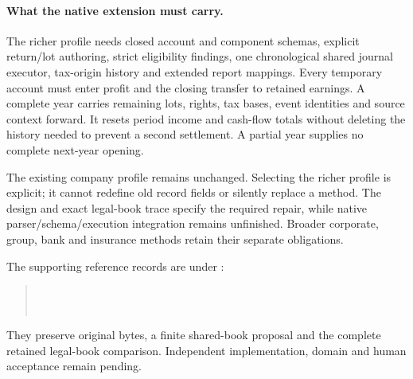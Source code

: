 \paragraph{What the native extension must carry.}
The richer profile needs closed account and component schemas, explicit
return/lot authoring, strict eligibility findings, one chronological shared
journal executor, tax-origin history and extended report mappings. Every
temporary account must enter profit and the closing transfer to retained
earnings. A complete year carries remaining lots, rights, tax bases, event
identities and source context forward. It resets period income and cash-flow
totals without deleting the history needed to prevent a second settlement.
A partial year supplies no complete next-year opening.

The existing company profile remains unchanged. Selecting the richer profile
is explicit; it cannot redefine old record fields or silently replace a
method. The design and exact legal-book trace specify the required repair,
while native parser/schema/execution integration remains unfinished. Broader
corporate, group, bank and insurance methods retain their separate obligations.

The supporting reference records are under :
\begin{quote}\small
{}\\
\\
\end{quote}
They preserve original bytes, a finite shared-book proposal and the complete
retained legal-book comparison. Independent implementation, domain and human
acceptance remain pending.
